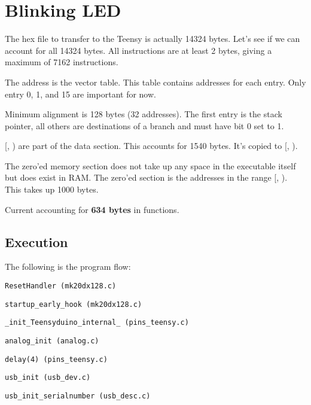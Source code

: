 \newpage
\section{Blinking LED}

The hex file to transfer to the Teensy is actually 14324 bytes.
Let's see if we can account for all 14324 bytes.
All instructions are at least 2 bytes, giving a maximum of 7162 instructions.

The address  is the vector table. This table contains
addresses for each entry. Only entry 0, 1, and 15 are important for now.

Minimum alignment is 128 bytes (32 addresses). The first entry is the stack
pointer, all others are destinations of a branch and must have bit 0 set to 1.

[, ) are part of the data
section. This accounts for 1540 bytes. It's copied to
[, ).

The zero'ed memory section does not take up any space in the executable itself
but does exist in RAM. The zero'ed section is the addresses in the range
[, ).
This takes up 1000 bytes.

Current accounting for \textbf{634 bytes} in functions.

\subsection{Execution}

The following is the program flow:

\indent \texttt{ResetHandler (mk20dx128.c)}

\hspace{2mm} \texttt{startup\_early\_hook (mk20dx128.c)}

\hspace{2mm} \texttt{\_init\_Teensyduino\_internal\_ (pins\_teensy.c)}

\hspace{4mm} \texttt{analog\_init (analog.c)}

\hspace{4mm} \texttt{delay(4) (pins\_teensy.c)}

\hspace{4mm} \texttt{usb\_init (usb\_dev.c)}

\hspace{6mm} \texttt{usb\_init\_serialnumber (usb\_desc.c)}

